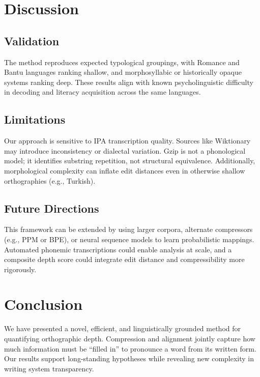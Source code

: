 \documentclass[12pt]{article}
\begin{document}
\section{Discussion}
\subsection{Validation}
The method reproduces expected typological groupings, with Romance and Bantu languages ranking shallow, and morphosyllabic or historically opaque systems ranking deep. These results align with known psycholinguistic difficulty in decoding and literacy acquisition across the same languages.

\subsection{Limitations}
Our approach is sensitive to IPA transcription quality. Sources like Wiktionary may introduce inconsistency or dialectal variation. Gzip is not a phonological model; it identifies substring repetition, not structural equivalence. Additionally, morphological complexity can inflate edit distances even in otherwise shallow orthographies (e.g., Turkish).

\subsection{Future Directions}
This framework can be extended by using larger corpora, alternate compressors (e.g., PPM or BPE), or neural sequence models to learn probabilistic mappings. Automated phonemic transcriptions could enable analysis at scale, and a composite depth score could integrate edit distance and compressibility more rigorously.

\section{Conclusion}
We have presented a novel, efficient, and linguistically grounded method for quantifying orthographic depth. Compression and alignment jointly capture how much information must be “filled in” to pronounce a word from its written form. Our results support long-standing hypotheses while revealing new complexity in writing system transparency.




\end{document}
